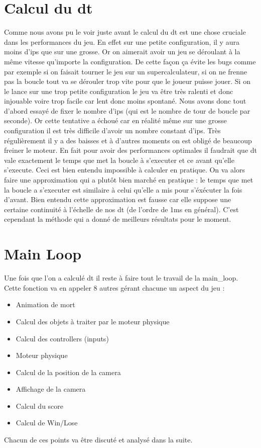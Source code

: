 \documentclass[11pt]{article}
\begin{document}
\section{Calcul du dt}
Comme nous avons pu le voir juste avant le calcul du dt est une chose cruciale dans les performances du jeu. En effet sur une petite configuration, il y aura moins d'ips que sur une grosse. Or on aimerait avoir un jeu se déroulant à la même vitesse qu'importe la configuration. De cette façon ça évite les bugs comme par exemple si on faisait tourner le jeu sur un supercalculateur, si on ne frenne pas la boucle tout va se dérouler trop vite pour que le joueur puisse jouer. Si on le lance sur une trop petite configuration le jeu va être très ralenti et donc injouable voire trop facile car lent donc moins spontané. Nous avons donc tout d'abord essayé de fixer le nombre d'ips (qui est le nombre de tour de boucle par seconde). Or cette tentative a échoué car en réalité même sur une grosse configuration il est très difficile d'avoir un nombre constant d'ips. Très régulièrement il y a des baisses et à d'autres moments on est obligé de beaucoup freiner le moteur. En fait pour avoir des performances optimales il faudrait que dt vale exactement le temps que met la boucle à s'executer et ce avant qu'elle s'execute. Ceci est bien entendu impossible à calculer en pratique. On va alors faire une approximation qui a plutôt bien marché en pratique : le temps que met la boucle a s'executer est similaire à celui qu'elle a mis pour s'éxécuter la fois d'avant. Bien entendu cette approximation est fausse car elle suppose une certaine continuité à l'échelle de nos dt (de l'ordre de 1ms en général). C'est cependant la méthode qui a donné de meilleurs résultats pour le moment.
\section{Main Loop}
Une fois que l'on a calculé dt il reste à faire tout le travail de la main\_loop. Cette fonction va en appeler 8 autres gérant chacune un aspect du jeu : 
\begin{itemize}
\item Animation de mort
\item Calcul des objets à traiter par le moteur physique
\item Calcul des controllers (inputs)
\item Moteur physique
\item Calcul de la position de la camera
\item Affichage de la camera
\item Calcul du score
\item Calcul de Win/Lose
\end{itemize}
Chacun de ces points va être discuté et analysé dans la suite.
\end{document}
